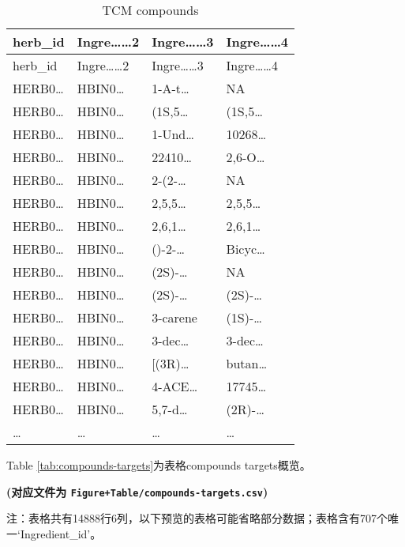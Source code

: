 \documentclass[
]{article}
\begin{document}
\begin{longtable}[]{@{}llll@{}}
\caption{\label{tab:TCM-compounds}TCM compounds}\tabularnewline
\toprule
herb\_id & Ingre\ldots\ldots2 & Ingre\ldots\ldots3 & Ingre\ldots\ldots4\tabularnewline
\midrule
\endfirsthead
\toprule
herb\_id & Ingre\ldots\ldots2 & Ingre\ldots\ldots3 & Ingre\ldots\ldots4\tabularnewline
\midrule
\endhead
HERB0\ldots{} & HBIN0\ldots{} & 1-A-t\ldots{} & NA\tabularnewline
HERB0\ldots{} & HBIN0\ldots{} & (1S,5\ldots{} & (1S,5\ldots{}\tabularnewline
HERB0\ldots{} & HBIN0\ldots{} & 1-Und\ldots{} & 10268\ldots{}\tabularnewline
HERB0\ldots{} & HBIN0\ldots{} & 22410\ldots{} & 2,6-O\ldots{}\tabularnewline
HERB0\ldots{} & HBIN0\ldots{} & 2-(2-\ldots{} & NA\tabularnewline
HERB0\ldots{} & HBIN0\ldots{} & 2,5,5\ldots{} & 2,5,5\ldots{}\tabularnewline
HERB0\ldots{} & HBIN0\ldots{} & 2,6,1\ldots{} & 2,6,1\ldots{}\tabularnewline
HERB0\ldots{} & HBIN0\ldots{} & ()-2-\ldots{} & Bicyc\ldots{}\tabularnewline
HERB0\ldots{} & HBIN0\ldots{} & (2S)-\ldots{} & NA\tabularnewline
HERB0\ldots{} & HBIN0\ldots{} & (2S)-\ldots{} & (2S)-\ldots{}\tabularnewline
HERB0\ldots{} & HBIN0\ldots{} & 3-carene & (1S)-\ldots{}\tabularnewline
HERB0\ldots{} & HBIN0\ldots{} & 3-dec\ldots{} & 3-dec\ldots{}\tabularnewline
HERB0\ldots{} & HBIN0\ldots{} & {[}(3R)\ldots{} & butan\ldots{}\tabularnewline
HERB0\ldots{} & HBIN0\ldots{} & 4-ACE\ldots{} & 17745\ldots{}\tabularnewline
HERB0\ldots{} & HBIN0\ldots{} & 5,7-d\ldots{} & (2R)-\ldots{}\tabularnewline
\ldots{} & \ldots{} & \ldots{} & \ldots{}\tabularnewline
\bottomrule
\end{longtable}

Table \ref{tab:compounds-targets}为表格compounds targets概览。

\textbf{(对应文件为 \texttt{Figure+Table/compounds-targets.csv})}

\begin{center}\begin{tcolorbox}[colback=gray!10, colframe=gray!50, width=0.9\linewidth, arc=1mm, boxrule=0.5pt]注：表格共有14888行6列，以下预览的表格可能省略部分数据；表格含有707个唯一`Ingredient\_id'。
\end{tcolorbox}
\end{center}
\end{document}
